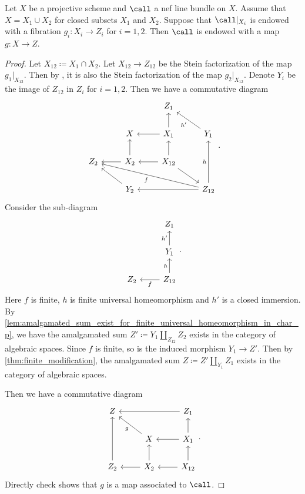     \begin{proposition}\label{prop:EWM_for_reducible}
        Let \(X\) be a projective scheme and \(\call\) a nef line bundle on \(X\).
        Assume that \(X = X_1 \cup X_2\) for closed subsets \(X_1\) and \(X_2\).
        Suppose that \(\call|_{X_i}\) is endowed with a fibration \(g_i:X_i \to Z_i\) for \(i = 1,2\).
        Then \(\call\) is endowed with a map \(g: X \to Z\).
    \end{proposition}
    \begin{proof}
        Let \(X_{12} \coloneqq X_1 \cap X_2\).
        Let \(X_{12} \to Z_{12}\) be the Stein factorization of the map \(g_1|_{X_{12}}\).
        Then by , it is also the Stein factorization of the map \(g_2|_{X_{12}}\).
        Denote \(Y_i\) be the image of \(Z_{12}\) in \(Z_i\) for \(i=1,2\).
        Then we have a commutative diagram
        \[ \begin{tikzcd}
             & & Z_1 & \\
             & X & X_1 \arrow[l] \arrow[u] & Y_1 \arrow[lu, "h'"] \\
            Z_2 & X_2 \arrow[l] \arrow[u] & X_{12} \arrow[l] \arrow[u] \arrow[rd] & \\
            & Y_2 \arrow[lu] & & Z_{12} \arrow[uu, "h"] \arrow[ll] \arrow[lllu, "f"]
        \end{tikzcd}. \]
        Consider the sub-diagram
        \[ \begin{tikzcd}
            & Z_1 \\
            & Y_1 \arrow[u, "h'"] \\
            Z_2 & Z_{12} \arrow[l, "f"] \arrow[u, "h"]
        \end{tikzcd}. \]
        Here \(f\) is finite, \(h\) is finite universal homeomorphism and \(h'\) is a closed immersion.
        By \cref{lem:amalgamated_sum_exist_for_finite_universal_homeomorphism_in_char_p}, we have the amalgamated sum \(Z' \coloneqq Y_1 \amalg_{Z_{12}} Z_2\) exists in the category of algebraic spaces.
        Since \(f\) is finite, so is the induced morphism \(Y_{1} \to Z'\).
        Then by \cref{thm:finite_modification}, the amalgamated sum \(Z \coloneqq Z' \amalg_{Y_1} Z_1\) exists in the category of algebraic spaces.

        Then we have a commutative diagram
        \[ \begin{tikzcd}
            Z & & Z_1 \arrow[ll] \\
             & X \arrow[lu, "g"] & X_1 \arrow[l] \arrow[u] \\
            Z_2 \arrow[uu] & X_2 \arrow[l] \arrow[u] & X_{12} \arrow[l] \arrow[u]
        \end{tikzcd}. \]
        Directly check shows that \(g\) is a map associated to \(\call\).
    \end{proof}

